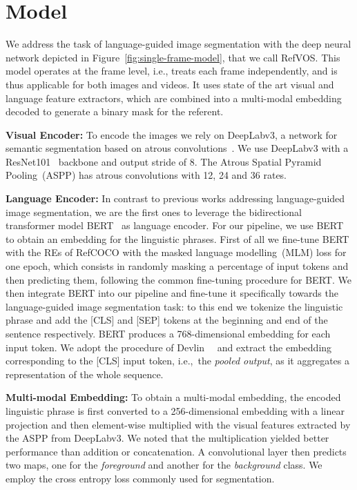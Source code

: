 \documentclass[10pt,twocolumn,letterpaper]{article}
\begin{document}
 \section{Model}
\label{sec:single-frame-models}
We address the task of language-guided image segmentation with the deep neural network depicted in Figure~\ref{fig:single-frame-model}, that we call RefVOS.
This model operates at the frame level, i.e., treats each frame independently, and is thus applicable for both images and videos.
It uses state of the art visual and language feature extractors, which are combined into a multi-modal embedding decoded to generate a binary mask for the referent.


\noindent
\textbf{Visual Encoder:} To encode the images we rely on DeepLabv3, a network for semantic segmentation based on atrous convolutions~\cite{chen2017rethinking}. We use DeepLabv3 with a ResNet101~\cite{he2016deep} backbone and output stride of 8. The Atrous Spatial Pyramid Pooling~(ASPP) has atrous convolutions with 12, 24 and 36 rates.



\noindent
\textbf{Language Encoder:} In contrast to previous works addressing language-guided image segmentation, we are the first ones to leverage the bidirectional transformer model BERT~\cite{devlin2019bert} as language encoder. For our pipeline, we use BERT to obtain an embedding for the linguistic phrases. First of all we fine-tune BERT with the REs of RefCOCO with the masked language modelling~(MLM) loss for one epoch, which consists in randomly masking a percentage of input tokens and then predicting them, following the common fine-tuning procedure for BERT. We then integrate BERT into our pipeline and fine-tune it specifically  
towards the language-guided image segmentation task: to this end we tokenize the linguistic phrase and add the [CLS] and [SEP] tokens at the beginning and end of the sentence respectively. BERT produces a 768-dimensional embedding for each input token. We adopt the procedure of Devlin~\etal~\cite{devlin2019bert} and extract the embedding corresponding to the [CLS] input token, i.e.,~the \textit{pooled output}, as it aggregates a representation of the whole sequence. 

\noindent
\textbf{Multi-modal Embedding:} To obtain a multi-modal embedding, the encoded linguistic phrase is first converted to a 256-dimensional embedding with a linear projection and then element-wise multiplied with the visual features extracted by the ASPP from DeepLabv3. 
We noted that the multiplication yielded better performance than addition or concatenation. A convolutional layer then predicts two maps, one for the \textit{foreground} and another for the \textit{background} class. We employ the cross entropy loss commonly used for segmentation.
\end{document}
